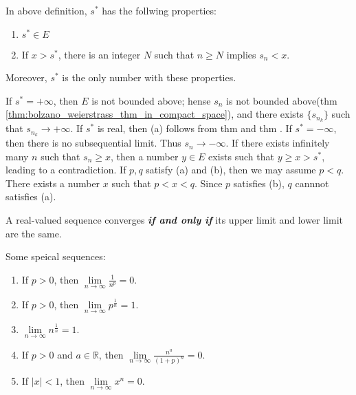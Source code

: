 \begin{theorem}
In above definition, $s^*$ has the follwing properties:
\begin{enumerate}[label={(\alph*)}]
\item $s^*\in E$
\item If $x>s^*$, there is an integer $N$ such that $n\geq N$ implies $s_n<x$.
\end{enumerate}
Moreover, $s^*$ is the only number with these properties.
\end{theorem}
\begin{hardproof}
 If $s^*=+\infty$, then $E$ is not bounded above; hense $s_n$ is not bounded above(thm \ref{thm:bolzano_weierstrass_thm_in_compact_space}), and there exists $\{s_{n_k}\}$ such that $s_{n_k}\to +\infty$. If $s^*$ is real, then (a) follows from thm  and thm . If $s^*=-\infty$, then there is no subsequential limit. Thus $s_n\to -\infty$.
 If there exists infinitely many $n$ such that $s_n\geq x$, then a number $y\in E$ exists such that $y\geq x>s^*$, leading to a contradiction.
 If $p,q$ satisfy (a) and (b), then we may assume $p<q$. There exists a number $x$ such that $p<x<q$. Since $p$ satisfies (b), $q$ cannnot satisfies (a).
\end{hardproof}

\begin{theorem}
\label{thm:seq_convergence_iff_limsup_liminf}
A real-valued sequence converges \textbf{\emph{if and only if}} its upper limit and lower limit are the same.
\end{theorem}

\begin{example}
[pma 3.20]
Some speical sequences:
\begin{enumerate}[label={(\alph*)}]
\item If $p>0$, then $\lim\limits_{n\to \infty}\frac{1}{n^p}=0$.
\item If $p>0$, then $\lim\limits_{n\to \infty}p^{\frac{1}{n}}=1$.
\item $\lim\limits_{n\to \infty}n^{\frac{1}{n}}=1$.
\item If $p>0$ and $a\in \mathbb{R}$, then $\lim\limits_{n\to \infty}\frac{n^a}{(1+p)^n}=0$.
\item If $|x|<1$, then $\lim\limits_{n\to \infty}x^n=0$.
\end{enumerate}
\end{example}

